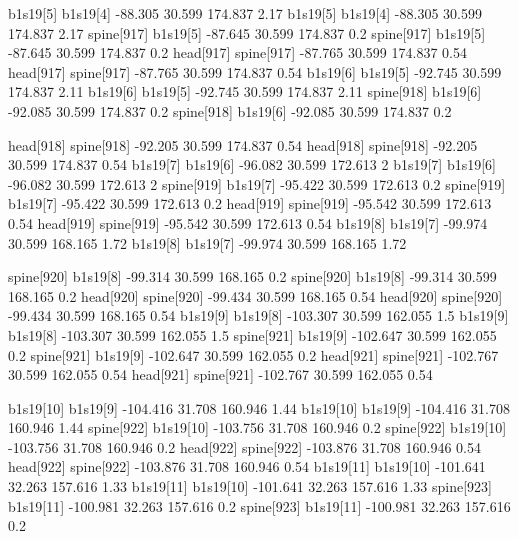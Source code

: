 b1s19[5]    b1s19[4]    -88.305    30.599    174.837    2.17
b1s19[5]    b1s19[4]    -88.305    30.599    174.837    2.17
spine[917]    b1s19[5]    -87.645    30.599    174.837    0.2
spine[917]    b1s19[5]    -87.645    30.599    174.837    0.2
head[917]    spine[917]    -87.765    30.599    174.837    0.54
head[917]    spine[917]    -87.765    30.599    174.837    0.54
b1s19[6]    b1s19[5]    -92.745    30.599    174.837    2.11
b1s19[6]    b1s19[5]    -92.745    30.599    174.837    2.11
spine[918]    b1s19[6]    -92.085    30.599    174.837    0.2
spine[918]    b1s19[6]    -92.085    30.599    174.837    0.2


head[918]    spine[918]    -92.205    30.599    174.837    0.54
head[918]    spine[918]    -92.205    30.599    174.837    0.54
b1s19[7]    b1s19[6]    -96.082    30.599    172.613    2
b1s19[7]    b1s19[6]    -96.082    30.599    172.613    2
spine[919]    b1s19[7]    -95.422    30.599    172.613    0.2
spine[919]    b1s19[7]    -95.422    30.599    172.613    0.2
head[919]    spine[919]    -95.542    30.599    172.613    0.54
head[919]    spine[919]    -95.542    30.599    172.613    0.54
b1s19[8]    b1s19[7]    -99.974    30.599    168.165    1.72
b1s19[8]    b1s19[7]    -99.974    30.599    168.165    1.72


spine[920]    b1s19[8]    -99.314    30.599    168.165    0.2
spine[920]    b1s19[8]    -99.314    30.599    168.165    0.2
head[920]    spine[920]    -99.434    30.599    168.165    0.54
head[920]    spine[920]    -99.434    30.599    168.165    0.54
b1s19[9]    b1s19[8]    -103.307    30.599    162.055    1.5
b1s19[9]    b1s19[8]    -103.307    30.599    162.055    1.5
spine[921]    b1s19[9]    -102.647    30.599    162.055    0.2
spine[921]    b1s19[9]    -102.647    30.599    162.055    0.2
head[921]    spine[921]    -102.767    30.599    162.055    0.54
head[921]    spine[921]    -102.767    30.599    162.055    0.54


b1s19[10]    b1s19[9]    -104.416    31.708    160.946    1.44
b1s19[10]    b1s19[9]    -104.416    31.708    160.946    1.44
spine[922]    b1s19[10]    -103.756    31.708    160.946    0.2
spine[922]    b1s19[10]    -103.756    31.708    160.946    0.2
head[922]    spine[922]    -103.876    31.708    160.946    0.54
head[922]    spine[922]    -103.876    31.708    160.946    0.54
b1s19[11]    b1s19[10]    -101.641    32.263    157.616    1.33
b1s19[11]    b1s19[10]    -101.641    32.263    157.616    1.33
spine[923]    b1s19[11]    -100.981    32.263    157.616    0.2
spine[923]    b1s19[11]    -100.981    32.263    157.616    0.2


